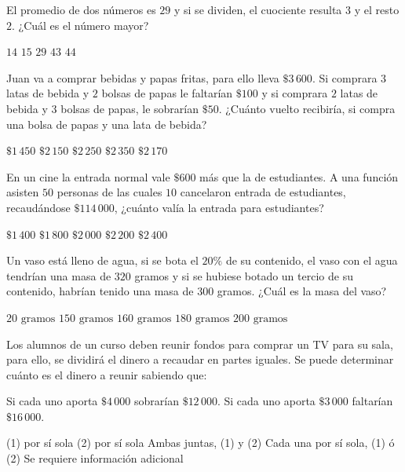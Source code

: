 \documentclass[sin nombre]{srs}
\begin{document}
\begin{preguntas}[after-item-skip=2cm]
\pregunta El promedio de dos números es $29$ y si se dividen, el cuociente resulta $3$ y el resto $2$. ¿Cuál es el número mayor?
\begin{vertical}
\alternativa $14$
\alternativa $15$
\alternativa $29$
\alternativa $43$
\alternativa $44$
\end{vertical}

\pregunta Juan va a comprar bebidas y papas fritas, para ello lleva $\$3\,600$. Si comprara $3$ latas de bebida y $2$ bolsas de papas le faltarían $\$100$ y si comprara $2$ latas de bebida y $3$ bolsas de papas, le sobrarían $\$50$. ¿Cuánto vuelto recibiría, si compra una bolsa de papas y una lata de bebida?
\begin{vertical}
\alternativa $\$1\,450$
\alternativa $\$2\,150$
\alternativa $\$2\,250$
\alternativa $\$2\,350$
\alternativa $\$2\,170$
\end{vertical}

\pregunta En un cine la entrada normal vale $\$600$ más que la de estudiantes. A una función asisten $50$ personas de las cuales $10$ cancelaron entrada de estudiantes, recaudándose $\$114\,000$, ¿cuánto valía la entrada para estudiantes?
\begin{vertical}
\alternativa $\$1\,400$
\alternativa $\$1\,800$
\alternativa $\$2\,000$
\alternativa $\$2\,200$
\alternativa $\$2\,400$
\end{vertical}

\pregunta Un vaso está lleno de agua, si se bota el $20\%$ de su contenido, el vaso con el agua tendrían una masa de $320$ gramos y si se hubiese botado un tercio de su contenido, habrían tenido una masa de $300$ gramos. ¿Cuál es la masa del vaso?
\begin{vertical}
\alternativa $20 \text{ gramos}$
\alternativa $150 \text{ gramos}$
\alternativa $160 \text{ gramos}$
\alternativa $180 \text{ gramos}$
\alternativa $200 \text{ gramos}$
\end{vertical}

\pregunta Los alumnos de un curso deben reunir fondos para comprar un TV para su sala, para ello, se dividirá el dinero a recaudar en partes iguales. Se puede determinar cuánto es el dinero a reunir sabiendo que:
\begin{verticaln}
\alternativa Si cada uno aporta $\$4\,000$ sobrarían $\$12\,000$.
\alternativa Si cada uno aporta $\$3\,000$ faltarían $\$16\,000$.
\end{verticaln}
\begin{vertical}
\alternativa (1) por sí sola
\alternativa (2) por sí sola
\alternativa Ambas juntas, (1) y (2)
\alternativa Cada una por sí sola, (1) ó (2)
\alternativa Se requiere información adicional
\end{vertical}


\end{preguntas}
\end{document}
